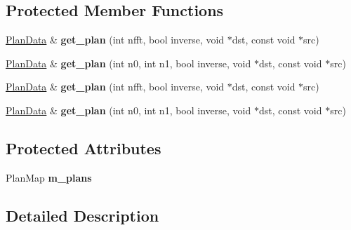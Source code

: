 \subsection*{Protected Member Functions}
\begin{DoxyCompactItemize}
\item 
\mbox{\label{struct_eigen_1_1internal_1_1fftw__impl_a705116e5b55434e52f90aef0eb4f8e8c}} 
\hyperlink{struct_eigen_1_1internal_1_1fftw__plan}{Plan\+Data} \& {\bfseries get\+\_\+plan} (int nfft, bool inverse, void $\ast$dst, const void $\ast$src)
\item 
\mbox{\label{struct_eigen_1_1internal_1_1fftw__impl_a07f7a7b9f8a6d74194641d54145c299a}} 
\hyperlink{struct_eigen_1_1internal_1_1fftw__plan}{Plan\+Data} \& {\bfseries get\+\_\+plan} (int n0, int n1, bool inverse, void $\ast$dst, const void $\ast$src)
\item 
\mbox{\label{struct_eigen_1_1internal_1_1fftw__impl_a705116e5b55434e52f90aef0eb4f8e8c}} 
\hyperlink{struct_eigen_1_1internal_1_1fftw__plan}{Plan\+Data} \& {\bfseries get\+\_\+plan} (int nfft, bool inverse, void $\ast$dst, const void $\ast$src)
\item 
\mbox{\label{struct_eigen_1_1internal_1_1fftw__impl_a07f7a7b9f8a6d74194641d54145c299a}} 
\hyperlink{struct_eigen_1_1internal_1_1fftw__plan}{Plan\+Data} \& {\bfseries get\+\_\+plan} (int n0, int n1, bool inverse, void $\ast$dst, const void $\ast$src)
\end{DoxyCompactItemize}
\subsection*{Protected Attributes}
\begin{DoxyCompactItemize}
\item 
\mbox{\label{struct_eigen_1_1internal_1_1fftw__impl_a94e5dea61b320ea677e1ac9e54ce9a9f}} 
Plan\+Map {\bfseries m\+\_\+plans}
\end{DoxyCompactItemize}


\subsection{Detailed Description}
